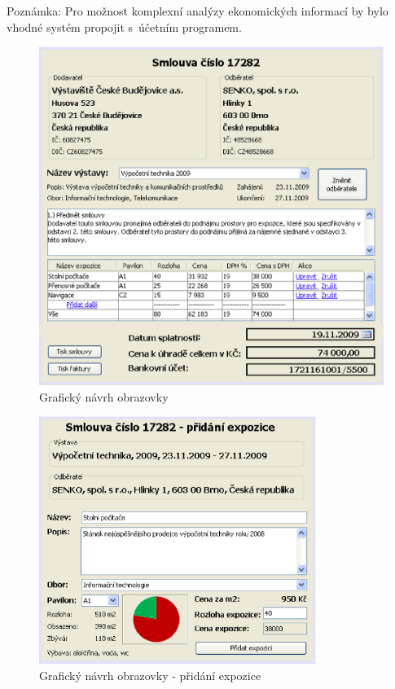 Poznámka: Pro možnost komplexní analýzy ekonomických informací by bylo vhodné systém propojit s~účetním programem.

\begin{figure}[H]
	\begin{center}
		\includegraphics[width=11.6cm,keepaspectratio]{include/gui_contract}
	\end{center}
\vspace{-4mm}
	\caption{Grafický návrh obrazovky }
	\label{fig:GuiContract}
\end{figure}

\begin{figure}[H]
	\begin{center}
		\includegraphics[width=9cm,keepaspectratio]{include/gui_contract2}
	\end{center}
\vspace{-4mm}
	\caption{Grafický návrh obrazovky  - přidání expozice}
	\label{fig:GuiContract2}
\end{figure}

